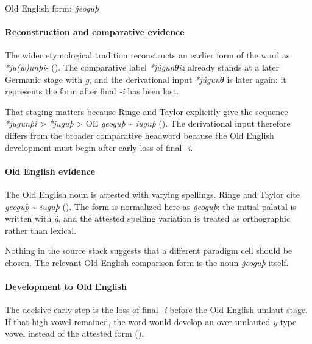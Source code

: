 \documentclass[
  british,
  a4paper,
]{article}
\begin{document}
Old English form: \emph{ġeoguþ}

\paragraph{Reconstruction and comparative
evidence}\label{reconstruction-and-comparative-evidence-38}

The wider etymological tradition reconstructs an earlier form of the
word as \emph{*ju(w)unþi-} (). The comparative label \emph{*júgunθiz} already stands at a later
Germanic stage with \emph{g}, and the derivational input \emph{*júgunθ}
is later again: it represents the form after final \emph{-i} has been
lost.

That staging matters because Ringe and Taylor explicitly give the
sequence \emph{*jugunþi} \textgreater{} \emph{*juguþ} \textgreater{} OE
\emph{geoguþ} \textasciitilde{} \emph{iuguþ}
(). The
derivational input therefore differs from the broader comparative
headword because the Old English development must begin after early loss
of final \emph{-i}.

\paragraph{Old English evidence}\label{old-english-evidence-38}

The Old English noun is attested with varying spellings. Ringe and
Taylor cite \emph{geoguþ} \textasciitilde{} \emph{iuguþ}
(). The form
is normalized here as \emph{ġeoguþ}: the initial palatal is written with
\emph{ġ}, and the attested spelling variation is treated as orthographic
rather than lexical.

Nothing in the source stack suggests that a different paradigm cell
should be chosen. The relevant Old English comparison form is the noun
\emph{ġeoguþ} itself.

\paragraph{Development to Old
English}\label{development-to-old-english-38}

The decisive early step is the loss of final \emph{-i} before the Old
English umlaut stage. If that high vowel remained, the word would
develop an over-umlauted \emph{y}-type vowel instead of the attested
form ().
\end{document}
